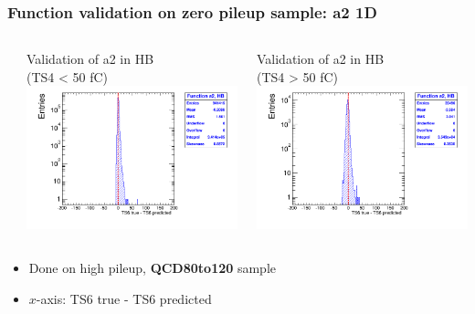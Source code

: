 \documentclass[bigger]{beamer}
\providecommand{\alert}[1]{\textbf{#1}}
\begin{document}
\begin{frame}
\frametitle{Function validation on zero pileup sample: a2 1D}
\label{sec-3-2-12}
\begin{columns} %
\label{sec-3-2-12-1}
\begin{column}{0.55\textwidth}
\label{sec-3-2-12-1-1}

\centering
Validation of a2 in HB \\ (TS4 < 50 fC)
\includegraphics[width=\textwidth]{fig/crosscheck_1D_sample80to120_a2_under50_ring0.png}
\end{column}
\begin{column}{0.55\textwidth}
\label{sec-3-2-12-1-2}

\centering
Validation of a2 in HB \\ (TS4 > 50 fC)
\includegraphics[width=\textwidth]{fig/crosscheck_1D_sample80to120_a2_over50_ring0.png}
\end{column}
\end{columns}
\label{sec-3-2-12-2}
\begin{itemize}

\item Done on high pileup, \alert{QCD80to120} sample
\label{sec-3-2-12-2-1}%

\item $x$-axis: TS6 true - TS6 predicted
\label{sec-3-2-12-2-2}%
\end{itemize} %
\end{frame}
\end{document}
